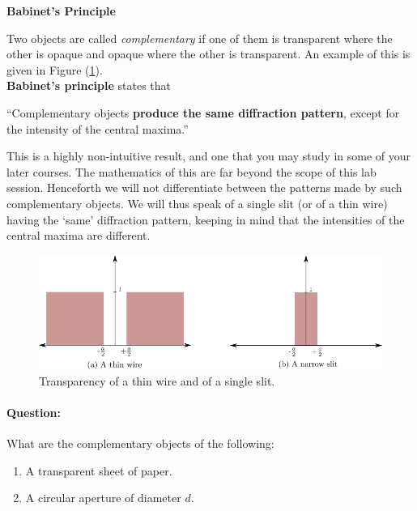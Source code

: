 \begin{imp}

\begin{center}
    \textbf{Babinet's Principle}
\end{center}

Two objects are called \textit{complementary} if one of them is transparent where the other is opaque and opaque where the other is transparent. An example of this is given in Figure (\ref{fig:complementary}).~\\

\textbf{Babinet's principle} states that

\begin{center}
``Complementary objects \textbf{produce the same diffraction pattern}, except for the intensity of the central maxima.''
\end{center}

This is a highly non-intuitive result, and one that you may study in some of your later courses. The mathematics of this are far beyond the scope of this lab session. 
Henceforth we will not differentiate between the patterns made by such complementary objects. We will thus speak of a single slit (or of a thin wire) having the `same' diffraction pattern, keeping in mind that the intensities of the central maxima are different.
\end{imp}

\begin{figure}[!htb]
    \centering
    \includegraphics[scale=0.6]{figs/complementary.png}
    \caption{Transparency of a thin wire and of a single slit.}
    \label{fig:complementary}
\end{figure}

\begin{question}
\paragraph{Question:} What are the complementary objects of the following:

\begin{enumerate}
\item A transparent sheet of paper.
\item A circular aperture of diameter $d$.
\end{enumerate}
\end{question}



